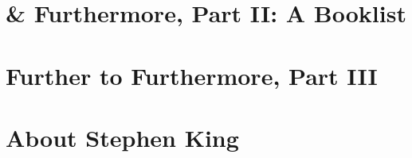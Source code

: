 \documentclass{article}
\numberwithin{equation}{section}
\begin{document}

\section{\& Furthermore, Part II: A Booklist}


\section{Further to Furthermore, Part III}


\section{About Stephen King}


\printbibliography[heading=bibintoc]
	
\end{document}
